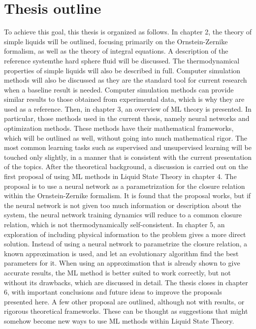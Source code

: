 \section{Thesis outline}
To achieve this goal, this thesis is organized as follows. In chapter 2, 
the theory of simple liquids will be outlined, focusing primarily on the Ornstein-Zernike
formalism, as well as the theory of integral equations.
A description of the reference system\textemdash the hard sphere fluid\textemdash 
will be discussed. The thermodynamical properties of simple liquids will also be described 
in full. Computer simulation methods will also be discussed as they are the standard tool 
for current research when a baseline result is needed. Computer simulation methods can 
provide similar results to those obtained from experimental data, which is why they are 
used as a reference.
Then, in chapter 3, an overview of ML theory is presented.
In particular, those methods used in the current thesis, namely neural networks and
optimization methods. These methods have their mathematical frameworks, which will be
outlined as well, without going into much mathematical rigor.
The most common learning tasks such as supervised and unsupervised learning will be
touched only slightly, in a manner that is consistent with the current presentation
of the topics.
After the theoretical background, a discussion is carried out on the first proposal of using 
ML methods in Liquid State Theory in chapter 4.
The proposal is to use a neural network as a 
parametrization for the closure relation within the Ornstein-Zernike formalism.
It is found that the proposal works, but if the neural
network is not given too much information or description about the system, the neural
network training dynamics will reduce to a common closure relation, which is not
thermodynamically self-consistent.
In chapter 5, an exploration of including physical information to the problem gives
a more direct solution. Instead of using a neural network to parametrize the closure
relation, a known approximation is used, and let an evolutionary algorithm find the
best parameters for it. When using an approximation that is already shown to give
accurate results, the ML method is better suited to work correctly, but not without
its drawbacks, which are discussed in detail.
The thesis closes in chapter 6, with important conclusions and future ideas
to improve the proposals presented here. A few other proposal are outlined, although
not with results, or rigorous theoretical frameworks. These can be thought as
suggestions that might somehow become new ways to use ML methods within Liquid
State Theory.